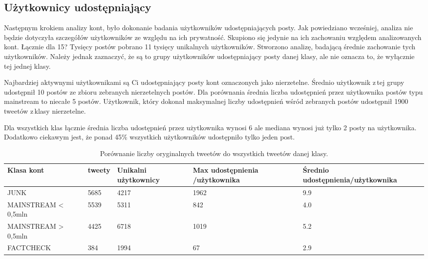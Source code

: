 \subsection{Użytkownicy udostępniający}
Następnym krokiem analizy kont, było dokonanie badania użytkowników udostępniających posty. Jak powiedziano wcześniej, analiza nie będzie dotyczyła szczegółów użytkowników ze względu na ich prywatność. Skupiono się jedynie na ich zachowaniu względem analizowanych kont. Łącznie dla 15? Tysięcy postów pobrano 11 tysięcy unikalnych użytkowników. Stworzono analizę, badającą średnie zachowanie tych użytkowników. Należy jednak zaznaczyć, że są to grupy użytkowników udostępniający posty danej klasy, ale nie oznacza to, że wyłącznie tej jednej klasy. 
\par
Najbardziej aktywnymi użytkownikami są Ci udostępniający posty kont oznaczonych jako nierzetelne. Średnio użytkownik z\,tej grupy udostępnił 10 postów ze zbioru zebranych nierzetelnych postów. Dla porównania średnia liczba udostępnień przez użytkownika postów typu mainstream to niecałe 5 postów.  Użytkownik, który dokonał maksymalnej liczby udostępnień wśród zebranych postów udostępnił 1900 tweetów z\,klasy nierzetelne. 
\par
Dla wszystkich klas łącznie średnia liczba udostępnień przez użytkownika wynosi 6 ale mediana wynosi już tylko 2 posty na użytkownika. Dodatkowo ciekawym jest, że ponad 45\% wszystkich użytkowników udostępniło tylko jeden post.  

\begin{table}[!h]
\centering 
\caption{Porównanie liczby oryginalnych tweetów do wszystkich tweetów danej klasy.} \label{tab:liczbaretweeterow}
\begin{tabular}{|m{}|R{2,5cm}|R{2,5cm}|R{2,5cm}|R{2,5cm}|} 
\hline
Klasa kont & tweety & Unikalni użytkownicy & Max udostępnienia /użytkownika & Średnio udostępnienia/użytkownika \\ 
\hline
JUNK & 5685 & 4217 & 1962 & 9.9 \\ 
\hline
MAINSTREAM \textless{} 0,5mln & 5539 & 5311 & 842 & 4.0 \\ 
\hline
MAINSTREAM \textgreater{} 0,5mln & 4425 & 6718 & 1019 & 5.2 \\ 
\hline
FACTCHECK & 384 & 1994 & 67 & 2.9 \\
\hline
\end{tabular}
\end{table}

